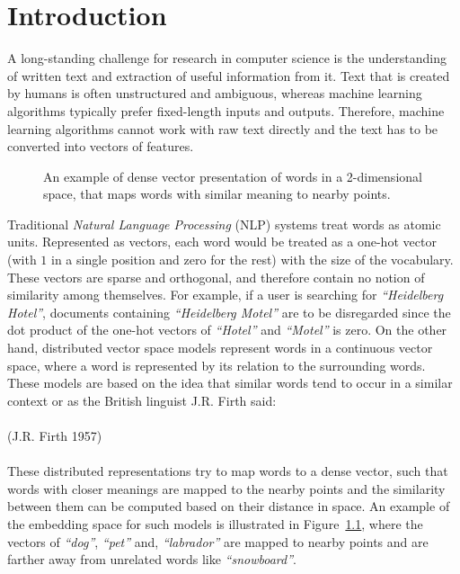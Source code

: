 \chapter{Introduction}\label{chap:intro}
A long-standing challenge for research in computer science is the understanding of written text and extraction of useful information from it. Text that is created by humans is often unstructured and ambiguous, whereas machine learning algorithms typically prefer fixed-length inputs and outputs. Therefore, machine learning algorithms cannot work with raw text directly and the text has to be converted into vectors of features.
\\
\begin{figure}
\centering 
\resizebox{0.3\textwidth}{0.25\textwidth}{      

}
\caption{An example of dense vector presentation of words in a 2-dimensional space, that maps words with similar meaning to nearby points.}
\label{fig:vsmodels}
\end{figure}
Traditional \emph{Natural Language Processing} (NLP) systems treat words as atomic units. Represented as vectors, each word would be treated as a one-hot vector (with $1$ in a single position and zero for the rest) with the size of the vocabulary. These vectors are sparse and orthogonal, and therefore contain no notion of similarity among themselves. For example, if a user is searching for \emph{``Heidelberg Hotel''}, documents containing \emph{``Heidelberg Motel''} are to be disregarded since the dot product of the one-hot vectors of \emph{``Hotel''} and \emph{``Motel''} is zero. On the other hand, distributed vector space models represent words in a continuous vector space, where a word is represented by its relation to the surrounding words. These models are based on the idea that similar words tend to occur in a similar context or as the British linguist J.R. Firth said:\\ \\
\noindent
{} (J.R. Firth 1957)\\
\\
These distributed representations try to map words to a dense vector, such that words with closer meanings are mapped to the nearby points and the similarity between them can be computed based on their distance in space. An example of the embedding space for such models is illustrated in Figure~\ref{fig:vsmodels}, where the vectors of \emph{``dog''},  \emph{``pet''} and, \emph{``labrador''} are mapped to nearby points and are farther away from unrelated words like \emph{``snowboard''}.
